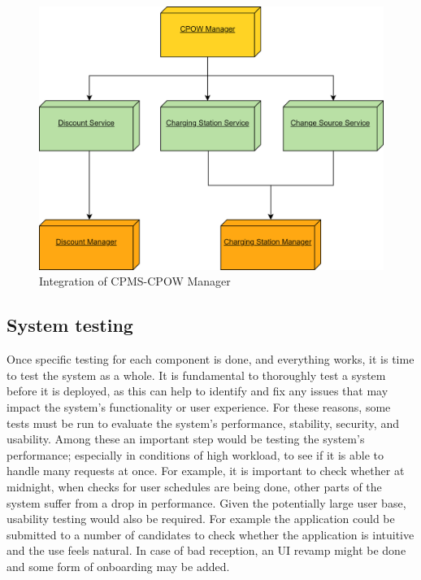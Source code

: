 \documentclass[table, 12pt]{article}
\begin{document}
\begin{figure}[H]
    \centering
    \includegraphics[scale=0.6]{assets/Integration Diagrams/CPMS-CPOW Manager.png} 
    \caption{Integration of CPMS-CPOW Manager}%
    \label{fig: CPMS-CPOW Manager}%
\end{figure}



\subsection{System testing}
Once specific testing for each component is done, and everything works, it is time to test the system as a whole. It is fundamental to thoroughly test a system before it is deployed, as this can help to identify and fix any issues that may impact the system's functionality or user experience.
For these reasons, some tests must be run to evaluate the system's performance, stability, security, and usability. Among these an important step would be testing the system's performance; especially in conditions
of high workload, to see if it is able to handle many requests at once. For example, it is important to check whether at midnight, when checks for user schedules are being done, other parts of the system suffer from a drop in performance.
Given the potentially large user base, usability testing would also be required. For example the application could be submitted to a number of candidates to check whether the application is intuitive and 
the use feels natural. In case of bad reception, an UI revamp might be done and some form of onboarding may be added.
\end{document}
